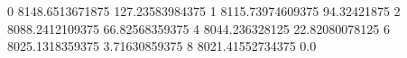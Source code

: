 0 8148.6513671875 127.23583984375
1 8115.73974609375 94.32421875
2 8088.2412109375 66.82568359375
4 8044.236328125 22.82080078125
6 8025.1318359375 3.71630859375
8 8021.41552734375 0.0
